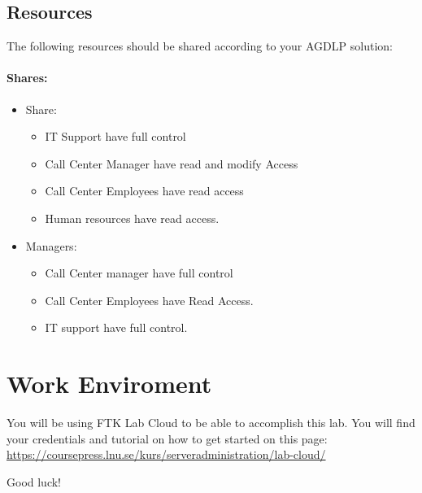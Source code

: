 \documentclass[paper=a4, fontsize=11pt]{report} %
\begin{document}
\subsection{Resources}
The following resources should be shared according to your AGDLP solution:
\paragraph{Shares:}
\begin{itemize}
	\item Share:
	\begin{itemize}
		\item IT Support have full control
		\item Call Center Manager have read and modify Access
		\item  Call Center Employees have read access
		\item  Human resources have read access.
	\end{itemize}
	\item Managers:
	\begin{itemize}
		\item Call Center manager have full control
		\item  Call Center Employees have Read Access.
		\item  IT support have full control.
	\end{itemize}
\end{itemize}

\section{Work Enviroment}

You will be using FTK Lab Cloud to be able to accomplish this lab. You will find your credentials and tutorial on how to get started on this page: \href{https://coursepress.lnu.se/kurs/serveradministration/lab-cloud/}{https://coursepress.lnu.se/kurs/serveradministration/lab-cloud/}

Good luck!
\end{document}
